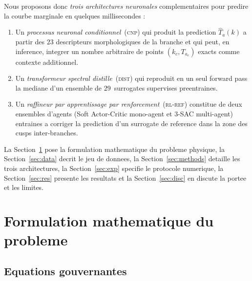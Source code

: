 \documentclass[11pt,a4paper]{article}
\newcommand{\Ta}{T_a}
\newcommand{\CNP}{\textsc{cnp}}              %
\newcommand{\DST}{\textsc{dist}}             %
\newcommand{\RLR}{\textsc{rl-ref}}           %
\begin{document}
Nous proposons donc \emph{trois architectures neuronales}
complementaires pour predire la courbe marginale en quelques
millisecondes :
\begin{enumerate}[leftmargin=*,itemsep=2pt,topsep=4pt]
\item Un \emph{processus neuronal conditionnel}~(\CNP{}) qui
   produit la prediction $\widehat\Ta(k)$ a partir des $23$
   descripteurs morphologiques de la branche et qui peut, en
   inference, integrer un nombre arbitraire de points
   $(k_c,\Ta_c)$ exacts comme contexte additionnel.
\item Un \emph{transformeur spectral distille}~(\DST{}) qui
   reproduit en un seul forward pass la mediane d'un ensemble de
   $29$~surrogates supervises preentraines.
\item Un \emph{raffineur par apprentissage par renforcement}~(\RLR{})
   constitue de deux ensembles d'agents (Soft Actor-Critic
   mono-agent et 3-SAC multi-agent) entraines a corriger la
   prediction d'un surrogate de reference dans la zone des cusps
   inter-branches.
\end{enumerate}
La Section~\ref{sec:phys} pose la formulation mathematique du
probleme physique, la Section~\ref{sec:data} decrit le jeu de
donnees, la Section~\ref{sec:methods} detaille les trois
architectures, la Section~\ref{sec:exp} specifie le protocole
numerique, la Section~\ref{sec:res} presente les resultats et
la Section~\ref{sec:disc} en discute la portee et les limites.


\section{Formulation mathematique du probleme}
\label{sec:phys}

\subsection{Equations gouvernantes}
\end{document}
